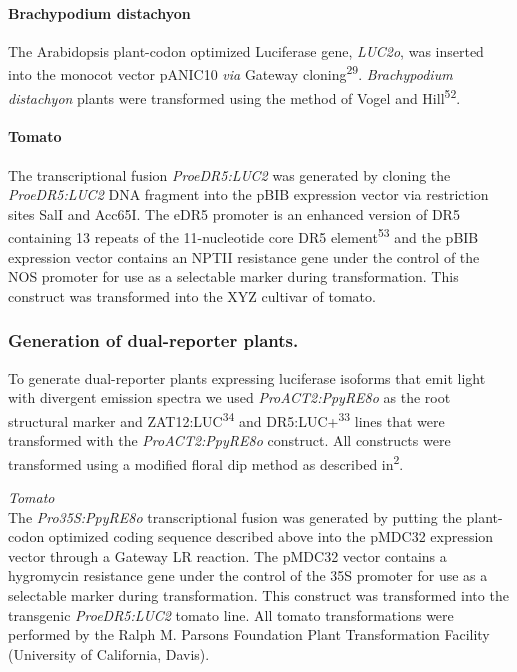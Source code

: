 \documentclass[]{article}
\begin{document}
\paragraph{Brachypodium distachyon}\label{brachypodium-distachyon}

The Arabidopsis plant-codon optimized Luciferase gene, \emph{LUC2o}, was
inserted into the monocot vector pANIC10 \emph{via} Gateway
cloning\textsuperscript{29}. \emph{Brachypodium distachyon} plants were
transformed using the method of Vogel and Hill\textsuperscript{52}.

\paragraph{Tomato}\label{tomato}

The transcriptional fusion \emph{ProeDR5:LUC2} was generated by cloning
the \emph{ProeDR5:LUC2} DNA fragment into the pBIB expression vector via
restriction sites SalI and Acc65I. The eDR5 promoter is an enhanced
version of DR5 containing 13 repeats of the 11-nucleotide core DR5
element\textsuperscript{53} and the pBIB expression vector contains an
NPTII resistance gene under the control of the NOS promoter for use as a
selectable marker during transformation. This construct was transformed
into the XYZ cultivar of tomato.

\subsubsection{\texorpdfstring{\textbf{Generation of dual-reporter
plants}.}{Generation of dual-reporter plants.}}\label{generation-of-dual-reporter-plants.}

To generate dual-reporter plants expressing luciferase isoforms that
emit light with divergent emission spectra we used
\emph{ProACT2:PpyRE8o} as the root structural marker and
ZAT12:LUC\textsuperscript{34} and DR5:LUC+\textsuperscript{33} lines
that were transformed with the \emph{ProACT2:PpyRE8o} construct. All
constructs were transformed using a modified floral dip method as
described in\textsuperscript{2}.

\emph{Tomato}\\The \emph{Pro35S:PpyRE8o} transcriptional fusion was
generated by putting the plant-codon optimized coding sequence described
above into the pMDC32 expression vector through a Gateway LR reaction.
The pMDC32 vector contains a hygromycin resistance gene under the
control of the 35S promoter for use as a selectable marker during
transformation. This construct was transformed into the transgenic
\emph{ProeDR5:LUC2} tomato line. All tomato transformations were
performed by the Ralph M. Parsons Foundation Plant Transformation
Facility (University of California, Davis).
\end{document}
